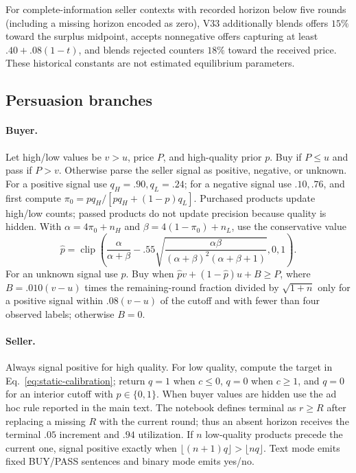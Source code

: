 For complete-information seller contexts with recorded horizon below five
rounds (including a missing horizon encoded as zero), V33 additionally blends
offers $15\%$ toward the surplus midpoint, accepts nonnegative offers capturing
at least $.40+.08(1-t)$, and blends rejected counters $18\%$ toward the received
price. These historical constants are not estimated equilibrium parameters.

\subsection{Persuasion branches}

\paragraph{Buyer.}
Let high/low values be $v>u$, price $P$, and high-quality prior $p$. Buy if
$P\le u$ and pass if $P>v$. Otherwise parse the seller signal as positive,
negative, or unknown. For a positive signal use $q_H=.90,q_L=.24$; for a
negative signal use $.10,.76$, and first compute
$\pi_0=pq_H/[pq_H+(1-p)q_L]$. Purchased products update high/low counts; passed
products do not update precision because quality is hidden. With
$\alpha=4\pi_0+n_H$ and $\beta=4(1-\pi_0)+n_L$, use the conservative value
\[
 \hat p=\operatorname{clip}\left(
 \frac{\alpha}{\alpha+\beta}-.55
 \sqrt{\frac{\alpha\beta}{(\alpha+\beta)^2(\alpha+\beta+1)}},0,1\right).
\]
For an unknown signal use $p$. Buy when
$\hat p v+(1-\hat p)u+B\ge P$, where $B=.010(v-u)$ times the remaining-round
fraction divided by $\sqrt{1+n}$ only for a positive signal within $.08(v-u)$
of the cutoff and with fewer than four observed labels; otherwise $B=0$.

\paragraph{Seller.}
Always signal positive for high quality. For low quality, compute the target in
Eq.~\ref{eq:static-calibration}; return $q=1$ when $c\le0$, $q=0$ when $c\ge1$,
and $q=0$ for an interior cutoff with $p\in\{0,1\}$. When buyer values are
hidden use the ad hoc rule reported in the main text. The notebook defines
terminal as $r\ge R$ after replacing a missing $R$ with the current round; thus
an absent horizon receives the terminal $.05$ increment and $.94$ utilization.
If $n$ low-quality products precede the current one, signal positive exactly
when $\lfloor(n+1)q\rfloor>\lfloor nq\rfloor$. Text mode emits fixed BUY/PASS
sentences and binary mode emits yes/no.

